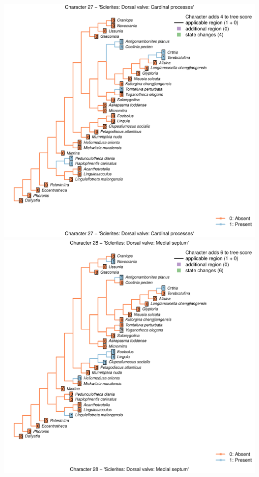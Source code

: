 \documentclass[]{book}
\theoremstyle{definition}
\theoremstyle{definition}
\theoremstyle{definition}
\theoremstyle{remark}
\begin{document}
\includegraphics{Brachiopod_phylogeny_files/figure-latex/unnamed-chunk-4-27.pdf}
\includegraphics{Brachiopod_phylogeny_files/figure-latex/unnamed-chunk-4-28.pdf}
\end{document}
